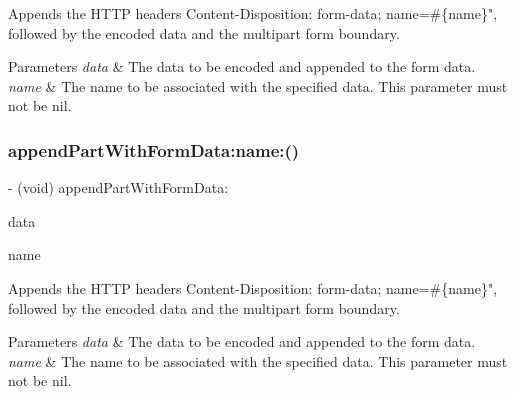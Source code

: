 Appends the H\+T\+TP headers {\ttfamily Content-\/\+Disposition\+: form-\/data; name=\#\{name\}"}, followed by the encoded data and the multipart form boundary.


\begin{DoxyParams}{Parameters}
{\em data} & The data to be encoded and appended to the form data. \\
\hline
{\em name} & The name to be associated with the specified data. This parameter must not be {\ttfamily nil}. \\
\hline
\end{DoxyParams}
\mbox{\label{protocol_a_f_multipart_form_data-p_a6bfed0a6d12546d88ecb9ce90c6affb5}} 
\subsubsection{\texorpdfstring{append\+Part\+With\+Form\+Data\+:name\+:()}{appendPartWithFormData:name:()}\hspace{0.1cm}{\footnotesize\ttfamily [2/3]}}
{\footnotesize\ttfamily -\/ (void) append\+Part\+With\+Form\+Data\+: \begin{DoxyParamCaption}\item[{(N\+S\+Data $\ast$)}]{data }\item[{name:(N\+S\+String $\ast$)}]{name }\end{DoxyParamCaption}}

Appends the H\+T\+TP headers {\ttfamily Content-\/\+Disposition\+: form-\/data; name=\#\{name\}"}, followed by the encoded data and the multipart form boundary.


\begin{DoxyParams}{Parameters}
{\em data} & The data to be encoded and appended to the form data. \\
\hline
{\em name} & The name to be associated with the specified data. This parameter must not be {\ttfamily nil}. \\
\hline
\end{DoxyParams}
\mbox{\label{protocol_a_f_multipart_form_data-p_a6bfed0a6d12546d88ecb9ce90c6affb5}} 
